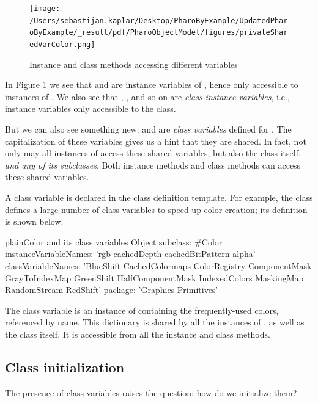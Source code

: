 \documentclass[10pt,twoside,english]{_support/latex/sbabook/sbabook}
\begin{document}
\begin{figure}

\begin{center}
\texttt{[image: /Users/sebastijan.kaplar/Desktop/PharoByExample/UpdatedPharoByExample/\_result/pdf/PharoObjectModel/figures/privateSharedVarColor.png]}\caption{Instance and class methods accessing different variables\label{fig:privateSharedVar}}\end{center}
\end{figure}


In Figure \ref{fig:privateSharedVar} we see that  and  are
instance variables of , hence only accessible to instances of
. We also see that , ,  and so
on are \textit{class instance variables}, i.e., instance variables only accessible to
the  class.

But we can also see something new:  and  are
\textit{class variables} defined for . The capitalization of these variables
gives us a hint that they are shared. In fact, not only may all instances of
 access these shared variables, but also the  class itself,
\textit{and any of its subclasses}. Both instance methods and class methods can
access these shared variables.

A class variable is declared in the class definition template. For example, the
class  defines a large number of class variables to speed up color
creation; its definition is shown below.

\begin{listing}[float, label=scr:classDefColor]{plain}{Color and its class variables}
Object subclass: #Color
	instanceVariableNames: 'rgb cachedDepth cachedBitPattern alpha'
	classVariableNames: 'BlueShift CachedColormaps ColorRegistry ComponentMask GrayToIndexMap GreenShift HalfComponentMask IndexedColors
    MaskingMap RandomStream RedShift'
	package: 'Graphics-Primitives'
\end{listing}

The class variable  is an instance of 
containing the frequently-used colors, referenced by name. This dictionary is
shared by all the instances of , as well as the class itself. It is
accessible from all the instance and class methods.
\subsection{Class initialization}
The presence of class variables raises the question: how do we initialize them?
\end{document}
